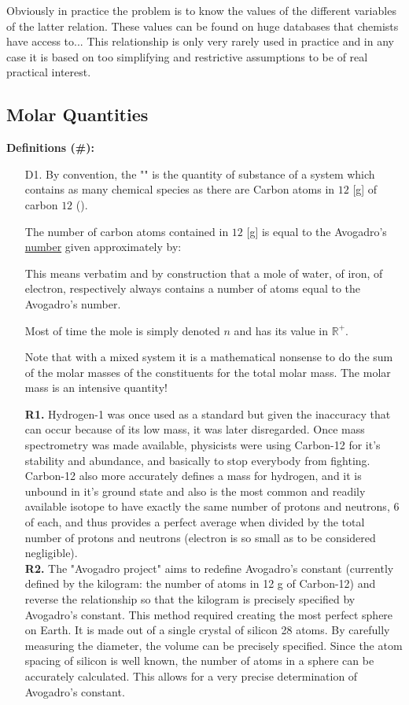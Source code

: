 	Obviously in practice the problem is to know the values of the different variables of the latter relation. These values can be found on huge databases that chemists have access to... This relationship is only very rarely used in practice and in any case it is based on too simplifying and restrictive assumptions to be of real practical interest.
	
	\subsection{Molar Quantities}
	\textbf{Definitions (\#\mydef):}
	\begin{enumerate}
		\item[D1.] By convention, the "" is the quantity of substance of a system which contains as many chemical species as there are Carbon atoms in $12$ [g] of carbon $12$ ().
		
		The number of carbon atoms contained in $12$ [g] is equal to the Avogadro's \underline{number} given approximately by:
		
		This means verbatim and by construction that a mole of water, of iron, of electron, respectively always contains a number of atoms equal to the Avogadro's number.
		
		Most of time the mole is simply denoted $n$ and has its value in $\mathbb{R}^{+}$.
		
		Note that with a mixed system it is a mathematical nonsense to do the sum of the molar masses of the constituents for the total molar mass. The molar mass is an intensive quantity!
		\begin{tcolorbox}[title=Remark,colframe=black,arc=10pt]
		\textbf{R1.} Hydrogen-1 was once used as a standard but given the inaccuracy that can occur because of its low mass, it was later disregarded. Once mass spectrometry was made available, physicists were using Carbon-12 for it's stability and abundance, and basically to stop everybody from fighting. Carbon-12 also more accurately defines a mass for hydrogen, and it is unbound in it's ground state and also is the most common and readily available isotope to have exactly the same number of protons and neutrons, 6 of each, and thus provides a perfect average when divided by the total number of protons and neutrons (electron is so small as to be considered negligible). \\
		
		\textbf{R2.} The "Avogadro project" aims to redefine Avogadro's constant (currently defined by the kilogram: the number of atoms in 12 g of Carbon-12) and reverse the relationship so that the kilogram is precisely specified by Avogadro's constant. This method required creating the most perfect sphere on Earth. It is made out of a single crystal of silicon 28 atoms. By carefully measuring the diameter, the volume can be precisely specified. Since the atom spacing of silicon is well known, the number of atoms in a sphere can be accurately calculated. This allows for a very precise determination of Avogadro's constant.
		\end{tcolorbox}	
		

\end{enumerate}
